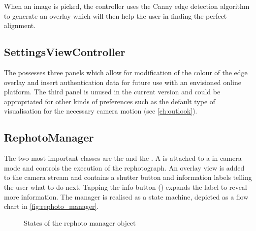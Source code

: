 
When an image is picked, the controller uses the Canny edge detection algorithm
\citep{canny1986} to generate an overlay which will then help the user in
finding the perfect alignment.


\subsection{SettingsViewController}

The  possesses three panels which allow for
modification of the colour of the edge overlay and insert authentication data for
future use with an envisioned online platform. The third panel is unused in the current
version and could be appropriated for other kinds of preferences such as the default type
of visualisation for the necessary camera motion (see \autoref{ch:outlook}).


\subsection{RephotoManager}

 The two most
important classes are the  and the
. A  is attached to
a  in camera mode and controls the execution of
the rephotograph. An overlay view is added to the camera stream and contains a
shutter button and information labels telling the user what to do next. Tapping
the info button ()
expands the label to reveal more information. The manager is realised as a state
machine, depicted as a flow chart in \autoref{fig:rephoto_manager}.

\begin{figure}[h]
   {\centering      
      
      \caption{States of the rephoto manager object}
   \label{fig:rephoto_manager}}
\end{figure}

